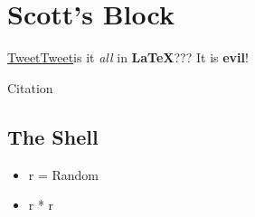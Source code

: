 \section{Scott's Block}


\href{http://www.twitter.com}{TweetTweet}is it \textit{all} in \textbf{LaTeX}??? It is \textbf{evil}!

Citation\cite{Ferry_2006}


\subsection{The Shell}
\begin{itemize}
\item r = Random
\item r * r
\end{itemize}